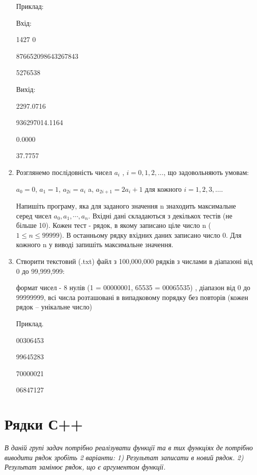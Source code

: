 \documentclass[]{article}
\begin{document}
\begin{enumerate}
Приклад:

Вхід:

1427 0

876652098643267843

5276538

Вихід:

2297.0716

936297014.1164

0.0000

37.7757
\item
Розглянемо послідовність чисел
\(a_{i}\) , $i = 0, 1, 2, \ldots$, що задовольняють умовам:

\(a_{0} = 0\), \(a_{1} = 1\), \(a_{2i} = a_{i}\) a,
\(a_{2i + 1} = {2a}_{i} + 1\) для кожного $i = 1, 2, 3, \ldots $.

Напишіть програму, яка для заданого значення n знаходить максимальне
серед чисел \(a_{0},a_{1},\cdots,a_{n}\). Вхідні дані складаються з
декількох тестів (не більше 10). Кожен тест - рядок, в якому записано
ціле число n ($1 \le n \le 99 999$). В останньому рядку вхідних даних записано
число 0. Для кожного n у виводі запишіть максимальне значення.
\item
Створити текстовий (.txt) файл з 100,000,000 рядків з числами в
діапазоні від 0 до 99,999,999:

формат чисел - 8 нулів (1 = 00000001, 65535 = 00065535) , діапазон від 0
до 99999999, всі числа розташовані в випадковому порядку без повторів
(кожен рядок -- унікальне число)

Приклад.

00306453

99645283

70000021

06847127
\end{enumerate}

\section {Рядки С++}

\emph{
В даній групі задач потрібно
реалізувати функції та в тих функціях де потрібно виводити рядок зробіть
2 варіанти: 1) Результат записати в новий рядок. 2) Результат замінює
рядок, що є аргументом функції.
}
\end{document}
